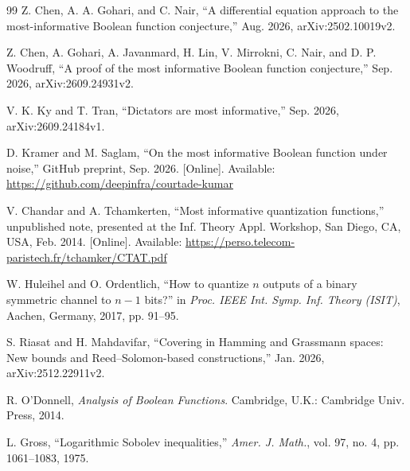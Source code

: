 \begin{thebibliography}{99}
Z. Chen, A. A. Gohari, and C. Nair, ``A differential equation approach
to the most-informative Boolean function conjecture,'' Aug. 2026,
arXiv:2502.10019v2.

Z. Chen, A. Gohari, A. Javanmard, H. Lin, V. Mirrokni, C. Nair, and
D. P. Woodruff, ``A proof of the most informative Boolean function
conjecture,'' Sep. 2026, arXiv:2609.24931v2.

V. K. Ky and T. Tran, ``Dictators are most informative,'' Sep. 2026,
arXiv:2609.24184v1.

D. Kramer and M. Saglam, ``On the most informative Boolean function
under noise,'' GitHub preprint, Sep. 2026. [Online]. Available:
\url{https://github.com/deepinfra/courtade-kumar}


V. Chandar and A. Tchamkerten, ``Most informative quantization
functions,'' unpublished note, presented at the Inf. Theory Appl.
Workshop, San Diego, CA, USA, Feb. 2014. [Online]. Available:
\url{https://perso.telecom-paristech.fr/tchamker/CTAT.pdf}

W. Huleihel and O. Ordentlich, ``How to quantize $n$ outputs of a binary
symmetric channel to $n-1$ bits?'' in \emph{Proc. IEEE Int. Symp. Inf.
Theory (ISIT)}, Aachen, Germany, 2017, pp. 91--95.

S. Riasat and H. Mahdavifar, ``Covering in Hamming and Grassmann spaces:
New bounds and Reed--Solomon-based constructions,'' Jan. 2026,
arXiv:2512.22911v2.

R. O'Donnell, \emph{Analysis of Boolean Functions}. Cambridge, U.K.:
Cambridge Univ. Press, 2014.

L. Gross, ``Logarithmic Sobolev inequalities,'' \emph{Amer. J. Math.},
vol. 97, no. 4, pp. 1061--1083, 1975.

\end{thebibliography}
